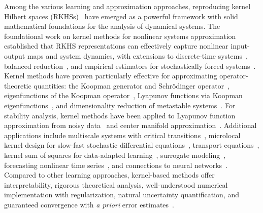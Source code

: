 \documentclass[11pt]{article}
\begin{document}
Among the various learning and approximation approaches, reproducing kernel Hilbert spaces (RKHSs)~\cite{CuckerandSmale, kanagawa2018gaussian} have emerged as a powerful framework with solid mathematical foundations for the analysis of dynamical systems. The foundational work on kernel methods for nonlinear systems approximation~\cite{bouvrie_hamzi_2017_siam, bouvrie_hamzi_2017_jcd} established that RKHS representations can effectively capture nonlinear input-output maps and system dynamics, with extensions to discrete-time systems~\cite{hamzi_colonius_2019}, balanced reduction~\cite{bouvrie_hamzi_2010_allerton}, and empirical estimators for stochastically forced systems~\cite{bouvrie_hamzi_2012_acc}. Kernel methods have proven particularly effective for approximating operator-theoretic quantities: the Koopman generator and Schr\"odinger operator~\cite{klus_nuske_hamzi_2020}, eigenfunctions of the Koopman operator~\cite{lee_hamzi_hou_owhadi_santin_vaidya_2025}, Lyapunov functions via Koopman eigenfunctions~\cite{lee_owhadi_hamzi_vaidya_2024}, and dimensionality reduction of metastable systems~\cite{bittracher_klus_hamzi_koltai_schutte_2019}. For stability analysis, kernel methods have been applied to Lyapunov function approximation from noisy data~\cite{giesl_hamzi_rasmussen_webster_2019} and center manifold approximation~\cite{haasdonk_hamzi_santin_wittwar_2020, haasdonk_hamzi_santin_wittwar_2021}. Additional applications include multiscale systems with critical transitions~\cite{hamzi_kuehn_mohamed_2019}, microlocal kernel design for slow-fast stochastic differential equations~\cite{hamzi_jafarian_owhadi_paillet_2022}, transport equations~\cite{hamzi_vaidya_owhadi_2025}, kernel sum of squares for data-adapted learning~\cite{lengyel_hamzi_owhadi_parpas_2024}, surrogate modeling~\cite{santin_haasdonk_2019}, forecasting nonlinear time series~\cite{alexander_giannakis_2020}, and connections to neural networks~\cite{smirnov_hamzi_owhadi_2022}. Compared to other learning approaches, kernel-based methods offer interpretability, rigorous theoretical analysis, well-understood numerical implementation with regularization, natural uncertainty quantification, and guaranteed convergence with \textit{a priori} error estimates~\cite{jalalian_ramirez_hsu_hosseini_owhadi_2025, batlle_chen_hosseini_owhadi_stuart_2023, chen_hosseini_owhadi_stuart_2021, long_mrvaljevic_zhe_hosseini_2023, owhadi_cgc}.
\end{document}
